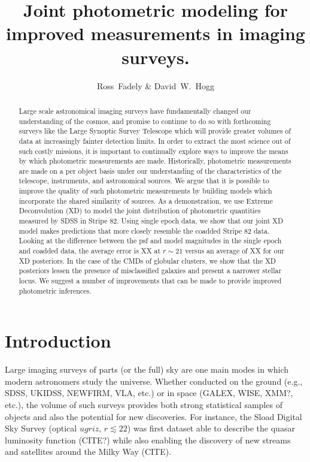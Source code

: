 \documentclass[12pt,preprint]{aastex}
\begin{document}
\title{Joint photometric modeling for improved measurements in imaging surveys.}
\author{Ross~Fadely \&
        David~W.~Hogg}


%
%
\begin{abstract}
Large scale astronomical imaging surveys have fundamentally changed our 
understanding of the cosmos, and promise to continue to do so with forthcoming 
surveys like the Large Synoptic Survey Telescope which will provide greater 
volumes of data at increasingly fainter detection limits.  In order to extract
the most science out of such costly missions, it is important to continually
explore ways to improve the means by which photometric measurements are made.
Historically, photometric measurements are made on a per object basis under
our understanding of the characteristics of the telescope, instruments, and
astronomical sources.  We argue that it is possible to improve the quality of
such photometric measurements by building models which incorporate the shared
similarity of sources.  As a demonstration, we use Extreme Deconvolution (XD)
to model the joint distribution of photometric quantities measured by SDSS in
Stripe 82.  Using single epoch data, we show that our joint XD model makes
predictions that more closely resemble the coadded Stripe 82 data.  Looking
at the difference between the psf and model magnitudes in the single epoch and 
coadded data, the average error is XX at $r\sim21$ versus an average of XX
for our XD posteriors.  In the case of the CMDs of globular clusters, we show
that the XD posteriors lessen the presence of misclassified galaxies and
present a narrower stellar locus.  We suggest a number of improvements that
can be made to provide improved photometric inferences.
\end{abstract}

%
%
\section{Introduction}

Large imaging surveys of parts (or the full) sky are one main modes in which
modern astronomers study the universe.  Whether conducted on the ground (e.g.,
SDSS, UKIDSS, NEWFIRM, VLA, etc.) or in space (GALEX, WISE, XMM?, etc.), the
volume of such surveys provides both strong statistical samples of objects and
also the potential for new discoveries.  For instance, the Sload Digital Sky
Survey (optical $ugriz$, $r\lesssim 22$) \citep{york00} was first dataset able
to describe the quasar luminosity function (CITE?) while also enabling the 
discovery of new streams and satellites around the Milky Way (CITE).
\end{document}
